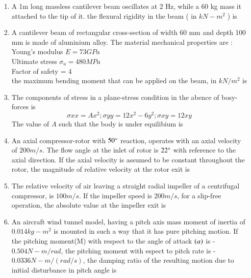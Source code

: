 \documentclass[journal]{IEEEtran}
\begin{document}
\begin{enumerate}
	\item A 1m long massless cantilever beam oscillates at 2 Hz, while a 60 kg mass it attached to the tip of it. the flexural rigidity in the beam ( in $kN-m^2$ ) is
	\item A cantilever beam of rectangular cross-section of width 60 mm and depth 100 mm is made of aluminium alloy. The material mechanical properties are : \\
	Young's modulus $E = 73 GPa $ \\
	Ultimate stress $\sigma_{u} = 480 MPa $ \\
	Factor of safety = 4 \\
	the maximum bending moment that can be applied on the beam, in $kN/m^2$ is
	\item The components of stress in a plane-stress condition in the abence of bosy-forces is \\
	$$\sigma{xx} = Ax^2; \sigma{yy} = 12x^2 - 6y^2 ; \sigma{xy} = 12xy $$
	The value of $A$ such that the body is under equilibium is
	\item An axial compressor-rotor with $50 \degree$ reaction, operates with an axial velocity of $200 m/s$. The flow angle at the inlet of rotor is $22 \degree$ with reference to the axial direction. If the axial velocity is assumed to be constant throughout the rotor, the magnitude of relative velocity at the rotor exit is
	\item The relative velocity of air leaving a straight radial impeller of a centrifugal compressor, is $100 m/s$. If the impeller speed is $200 m/s$, for a slip-free operation, the absolute value at the impeller exit is
	\item An aircraft wind tunnel model, having a pitch axis mass moment of inertia of $0.014 kg-m^2$ is mounted in such a way that it has pure pitching motion. If the pitching moment(M) with respect to the angle of attack $\left(\alpha\right)$ is -$0.504 N-m/rad$, the pitching moment with espect to pitch rate is -$0.0336 N-m/(rad/s)$, the damping ratio of the resulting motion due to initial disturbance in pitch angle is
\end{enumerate}
\end{document}
